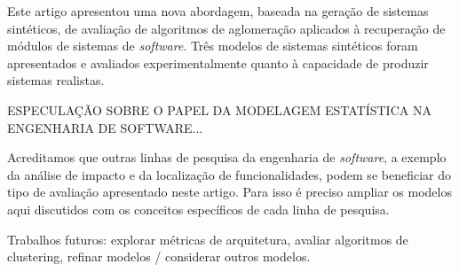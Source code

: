 \documentclass{acm_proc_article-sp}
\begin{document}
Este artigo apresentou uma nova abordagem, baseada na geração de sistemas sintéticos, de avaliação de algoritmos de aglomeração aplicados à recuperação de módulos de sistemas de \emph{software}. Três modelos de sistemas sintéticos foram apresentados e avaliados experimentalmente quanto à capacidade de produzir sistemas realistas.


ESPECULAÇÃO SOBRE O PAPEL DA MODELAGEM ESTATÍSTICA NA ENGENHARIA DE SOFTWARE...


Acreditamos que outras linhas de pesquisa da engenharia de \emph{software}, a exemplo da análise de impacto e da localização de funcionalidades, podem se beneficiar do tipo de avaliação apresentado neste artigo. Para isso é preciso ampliar os modelos aqui discutidos com os conceitos específicos de cada linha de pesquisa.

Trabalhos futuros: explorar métricas de arquitetura, avaliar algoritmos de clustering, refinar modelos / considerar outros modelos.


%


\end{document}
